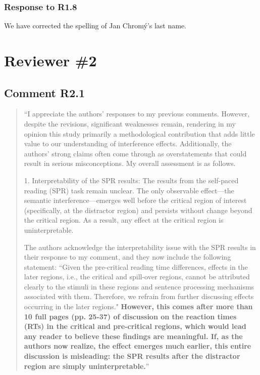 \documentclass[12pt]{article}
\begin{document}
\subsubsection*{Response to R1.8}
We have corrected the spelling of Jan Chromý's last name.

\section*{Reviewer \#2} 
\subsection*{Comment R2.1}
\begin{quote}
``I appreciate the authors' responses to my previous comments. However, despite the revisions, significant weaknesses remain, rendering in my opinion this study primarily a methodological contribution that adds little value to our understanding of interference effects. Additionally, the authors' strong claims often come through as overstatements that could result in serious misconceptions.
My overall assessment is as follows.

1. Interpretability of the SPR results: The results from the self-paced reading (SPR) task remain unclear. The only observable effect—the semantic interference—emerges well before the critical region of interest (specifically, at the distractor region) and persists without change beyond the critical region. As a result, any effect at the critical region is uninterpretable.

The authors acknowledge the interpretability issue with the SPR results in their response to my comment, and they now include the following statement: ``Given the pre-critical reading time differences, effects in the later regions, i.e., the critical and spill-over regions, cannot be attributed clearly to the stimuli in these regions and sentence processing mechanisms associated with them. Therefore, we refrain from further discussing effects occurring in the later regions." \textbf{However, this comes after more than 10 full pages (pp. 25-37) of discussion on the reaction times (RTs) in the critical and pre-critical regions, which would lead any reader to believe these findings are meaningful. If, as the authors now realize, the effect emerges much earlier, this entire discussion is misleading: the SPR results after the distractor region are simply uninterpretable.}''
\end{quote}
\end{document}
